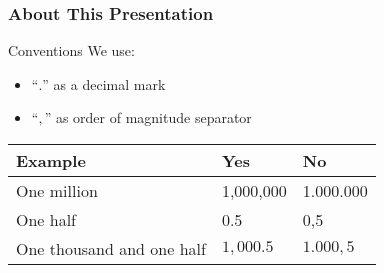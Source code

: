 \begin{frame}%
\frametitle{About This Presentation}
 \begin{block}{Conventions}
    We use:
    \begin{itemize}
    \item ``{\Huge$ .$}'' as a decimal mark
    \item ``{\Huge$,$}'' as order of magnitude separator
    \end{itemize}
    \begin{center}
    \begin{tabular}{|l|l|l|}\hline
      Example & Yes & No \\\hline
      One million & 1,000,000 & 1.000.000\\
      One half & 0.5 & 0,5\\
      One thousand and one half & $1,000.5$ & $1.000,5$\\\hline
    \end{tabular}
    \end{center}
 \end{block}
\end{frame}




\setcounter{framenumber}{0}
